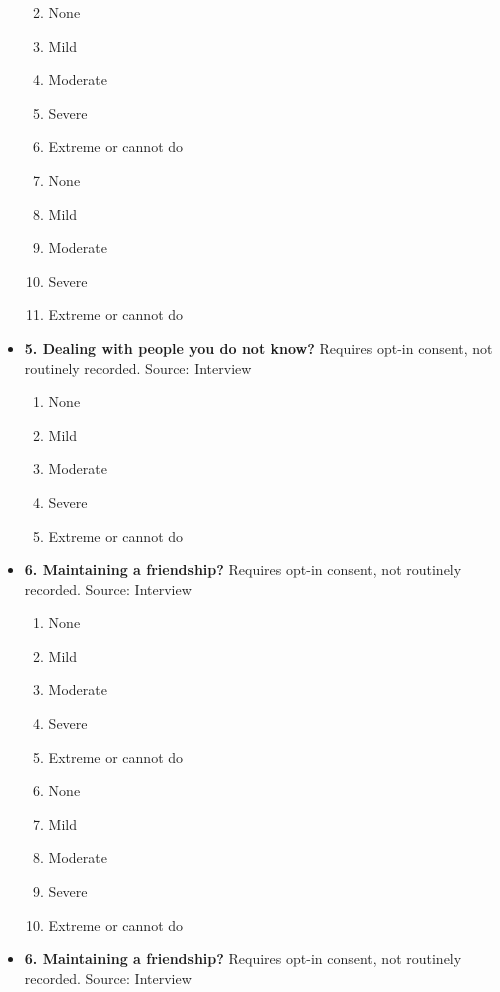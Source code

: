 \documentclass[
]{scrartcl}
\providecommand{\tightlist}{%
  \setlength{\itemsep}{0pt}\setlength{\parskip}{0pt}}\usepackage{longtable,booktabs,array}
\begin{document}
\begin{itemize}
  \begin{enumerate}
  \def\labelenumi{\arabic{enumi}.}
  \tightlist
  \item
    None
  \item
    Mild
  \item
    Moderate
  \item
    Severe
  \item
    Extreme or cannot do
  \item
    None
  \item
    Mild
  \item
    Moderate
  \item
    Severe
  \item
    Extreme or cannot do
  \end{enumerate}
\item
  \textbf{5. Dealing with people you do not know?} Requires opt-in
  consent, not routinely recorded. Source: Interview

  \begin{enumerate}
  \def\labelenumi{\arabic{enumi}.}
  \tightlist
  \item
    None
  \item
    Mild
  \item
    Moderate
  \item
    Severe
  \item
    Extreme or cannot do
  \end{enumerate}
\item
  \textbf{6. Maintaining a friendship?} Requires opt-in consent, not
  routinely recorded. Source: Interview

  \begin{enumerate}
  \def\labelenumi{\arabic{enumi}.}
  \tightlist
  \item
    None
  \item
    Mild
  \item
    Moderate
  \item
    Severe
  \item
    Extreme or cannot do
  \item
    None
  \item
    Mild
  \item
    Moderate
  \item
    Severe
  \item
    Extreme or cannot do
  \end{enumerate}
\item
  \textbf{6. Maintaining a friendship?} Requires opt-in consent, not
  routinely recorded. Source: Interview


\end{itemize}
\end{document}
